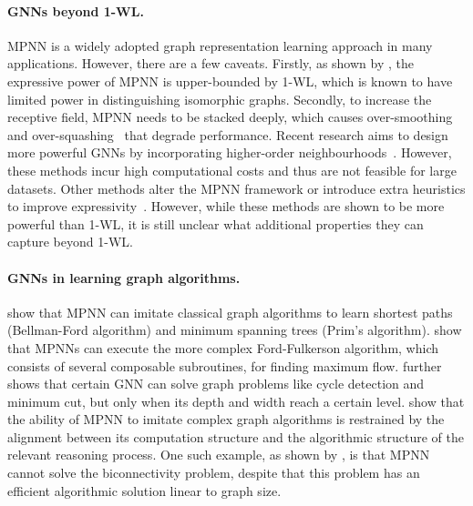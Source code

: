 \paragraph{GNNs beyond 1-WL.}
MPNN is a widely adopted graph representation learning approach in many applications. However, there are a few caveats. Firstly, as shown by \citet{xu2018powerful}, the expressive power of MPNN is upper-bounded by 1-WL, which is known to have limited power in distinguishing isomorphic graphs. Secondly, to increase the receptive field, MPNN needs to be stacked deeply, which causes over-smoothing~\citep{zhao2019pairnorm,chen2020measuring} and over-squashing~\citep{topping22oversquashing} that degrade performance. Recent research aims to design more powerful GNNs by incorporating higher-order neighbourhoods~\citep{maron2019provably,morris2019weisfeiler}. However, these methods incur high computational costs and thus are not feasible for large datasets. Other methods alter the MPNN framework or introduce extra heuristics to improve expressivity~\citep{bouritsas2022improving,bodnar2021weisfeiler,bodnar2021weisfeilercellular,bevilacqua2021equivariant,wijesinghe2021new}. However, while these methods are shown to be more powerful than 1-WL, it is still unclear what additional properties they can capture beyond 1-WL. 


\paragraph{GNNs in learning graph algorithms.}
\citet{Velickovic_neuralexecutoin} show that MPNN can imitate classical graph algorithms to learn shortest paths (Bellman-Ford algorithm) and minimum spanning trees (Prim’s algorithm). 
\citet{dobrik_neuralbipartite} show that MPNNs can execute the more complex Ford-Fulkerson algorithm, which consists of several composable subroutines, for finding maximum flow. 
\citet{loukas2020graph} further shows that certain GNN can solve graph problems like cycle detection and minimum cut, but only when its depth and width reach a certain level.
\citet{xu20_gnnreasoning} show that the ability of MPNN to imitate complex graph algorithms is restrained by the alignment between its computation structure and the algorithmic structure of the relevant reasoning process. 
One such example, as shown by \citet{anonymous2023rethinking}, is that MPNN cannot solve the biconnectivity problem, despite that this problem has an efficient algorithmic solution linear to graph size. 